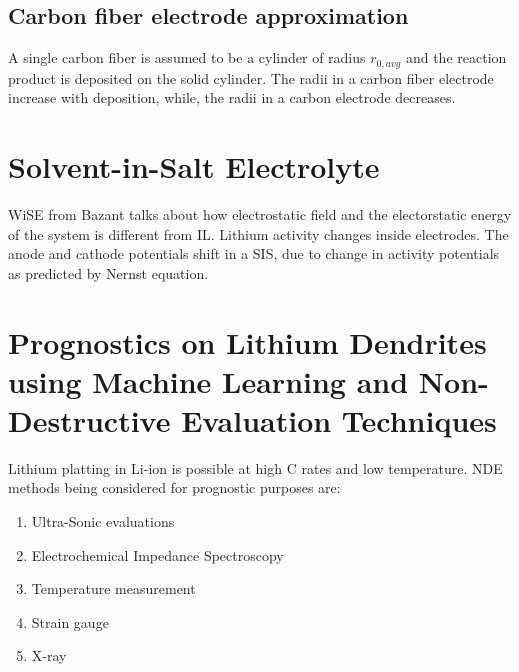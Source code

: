 \documentclass[12pt]{book}
\begin{document}
\subsection{Carbon fiber electrode approximation}
A single carbon fiber is assumed to be a cylinder of radius $r_{0,avg}$ and the reaction product is deposited on the solid cylinder. The radii in a carbon fiber electrode increase with deposition, while, the radii in a carbon electrode decreases.


\section{Solvent-in-Salt Electrolyte}
WiSE from Bazant talks about how electrostatic field and the electorstatic energy of the system is different from IL. 
Lithium activity changes inside electrodes. The anode and cathode potentials shift in a SIS, due to change in activity potentials as predicted by Nernst equation.


\section{Prognostics on Lithium Dendrites using Machine Learning and Non-Destructive Evaluation Techniques}
Lithium platting in Li-ion is possible at high C rates and low temperature. 
NDE methods being considered for prognostic purposes are: 
\begin{enumerate}
\item Ultra-Sonic evaluations
\item Electrochemical Impedance Spectroscopy
\item Temperature measurement
\item Strain gauge
\item X-ray
\end{enumerate}
\end{document}
